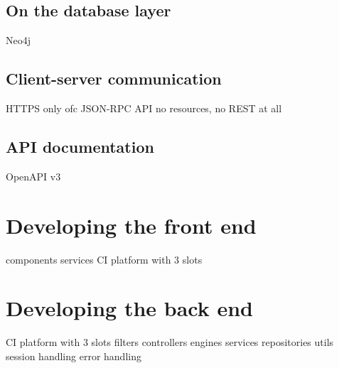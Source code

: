 \subsection{On the database layer}
Neo4j

\subsection{Client-server communication}
HTTPS only ofc
JSON-RPC API
no resources, no REST at all

\subsection{API documentation}
OpenAPI v3


\section{Developing the front end}
components
services
CI
platform with 3 slots

\section{Developing the back end}
CI
platform with 3 slots
filters
controllers
engines
services
repositories
utils
session handling
error handling
